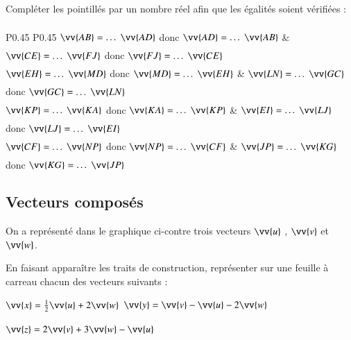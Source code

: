 \documentclass[oneside,12pt]{article}          %
\begin{document}
Compléter les pointillés par un nombre réel afin que les égalités soient vérifiées :

\renewcommand{\arraystretch}{1.5}
\begin{tabular}{P{0.45\linewidth} P{0.45\linewidth}}
	$\vv{AB} = \ldots \vv{AD}$ \quad donc \quad $\vv{AD} = \ldots \vv{AB}$ & 
	$\vv{CE} = \ldots \vv{FJ}$ \quad donc \quad $\vv{FJ} = \ldots \vv{CE}$ \\
	$\vv{EH} = \ldots \vv{MD}$ \quad donc \quad $\vv{MD} = \ldots \vv{EH}$ &
	$\vv{LN} = \ldots \vv{GC}$ \quad donc \quad $\vv{GC} = \ldots \vv{LN}$ \\
	$\vv{KP} = \ldots \vv{KA}$ \quad donc \quad $\vv{KA} = \ldots \vv{KP}$ &
	$\vv{EI} = \ldots \vv{LJ}$ \quad donc \quad $\vv{LJ} = \ldots \vv{EI}$ \\
	$\vv{CF} = \ldots \vv{NP}$ \quad donc \quad $\vv{NP} = \ldots \vv{CF}$ &
	$\vv{JP} = \ldots \vv{KG}$ \quad donc \quad $\vv{KG} = \ldots \vv{JP}$ \\
\end{tabular}



\subsection{Vecteurs composés}
\begin{minipage}{0.5\linewidth} \vspace{-2mm}
\end{minipage}
\begin{minipage}{0.5\linewidth} \restoreskip
	On a représenté dans le graphique ci-contre trois vecteurs $\vv{u}$ , $\vv{v}$ et $\vv{w}$.
	
	En faisant apparaître les traits de construction, représenter sur une feuille à carreau chacun des vecteurs suivants :
	
	$\vv{x}=\frac{1}{2}\vv{u}+2\vv{w}$ \qquad $\vv{y}=\vv{v}-\vv{u}-2\vv{w}$
	
	\qquad \qquad $\vv{z}=2\vv{v}+3\vv{w}-\vv{u}$
\end{minipage}
\end{document}
